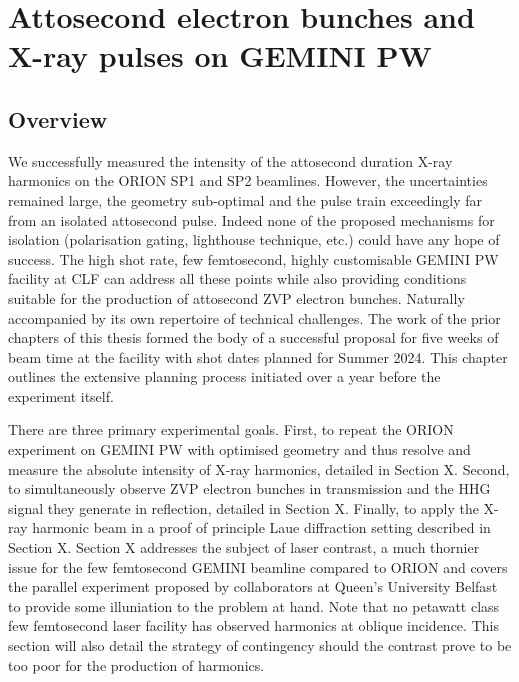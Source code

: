 \chapter{\label{ch:4-gemini}Attosecond electron bunches and X-ray pulses on GEMINI PW} 

\minitoc

\section{Overview}

We successfully measured the intensity of the attosecond duration X-ray harmonics on the ORION SP1 and SP2 beamlines. However, the uncertainties remained large, the geometry sub-optimal and the pulse train exceedingly far from an isolated attosecond pulse. Indeed none of the proposed mechanisms for isolation (polarisation gating, lighthouse technique, etc.) could have any hope of success. The high shot rate, few femtosecond, highly customisable GEMINI PW facility at CLF can address all these points while also providing conditions suitable for the production of attosecond ZVP electron bunches. Naturally accompanied by its own repertoire of technical challenges. The work of the prior chapters of this thesis formed the body of a successful proposal for five weeks of beam time at the facility with shot dates planned for Summer 2024. This chapter outlines the extensive planning process initiated over a year before the experiment itself.

There are three primary experimental goals. First, to repeat the ORION experiment on GEMINI PW with optimised geometry and thus resolve and measure the absolute intensity of X-ray harmonics, detailed in Section X. Second, to simultaneously observe ZVP electron bunches in transmission and the HHG signal they generate in reflection, detailed in Section X. Finally, to apply the X-ray harmonic beam in a proof of principle Laue diffraction setting described in Section X. Section X addresses the subject of laser contrast, a much thornier issue for the few femtosecond GEMINI beamline compared to ORION and covers the parallel experiment proposed by collaborators at Queen's University Belfast to provide some illuniation to the problem at hand. Note that no petawatt class few femtosecond laser facility has observed harmonics at oblique incidence. This section will also detail the strategy of contingency should the contrast prove to be too poor for the production of harmonics.



